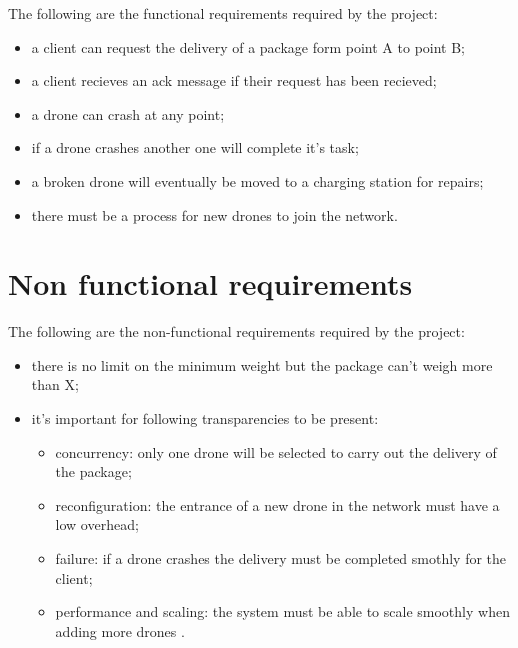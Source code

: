 \documentclass[a4paper, oneside]{memoir}
\begin{document}
The following are the functional requirements required by the project:
\begin{itemize}
\item a client can request the delivery of a package form point A to point B;
\item a client recieves an ack message if their request has been recieved;
\item a drone can crash at any point;
\item if a drone crashes another one will complete it's task;
\item a broken drone will eventually be moved to a charging station for repairs;
\item there must be a process for new drones to join the network.
\end{itemize}

\section{Non functional requirements}


The following are the non-functional requirements required by the project:
\begin{itemize}
\item there is no limit on the minimum weight but the package can't weigh more than X;
\item it's important for following transparencies to be present:
	\begin{itemize}
	\item concurrency: only one drone will be selected to carry out the delivery of the package;
	\item reconfiguration: the entrance of a new drone in the network must have a low overhead;
	\item failure: if a drone crashes the delivery must be completed smothly for the client;
	\item performance and scaling: the system must be able to scale smoothly when adding more drones .
	\end{itemize}
\end{itemize}
\end{document}
